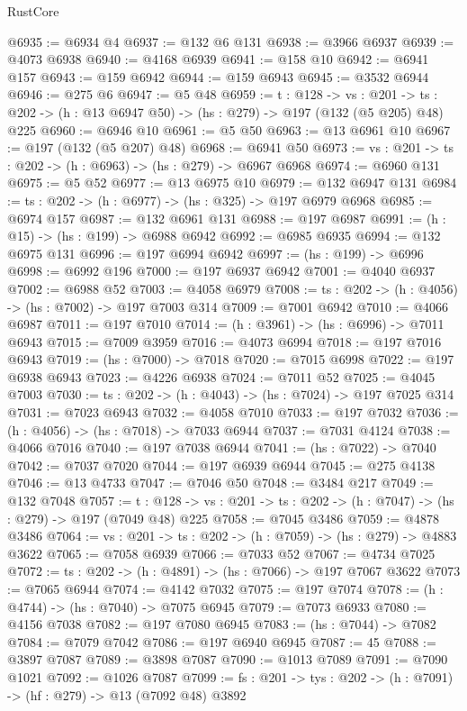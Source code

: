 \begin{lexlean}{RustCore}
\begin{coremodule}
@6935 := @6934 @4
@6937 := @132 @6 @131
@6938 := @3966 @6937
@6939 := @4073 @6938
@6940 := @4168 @6939
@6941 := @158 @10
@6942 := @6941 @157
@6943 := @159 @6942
@6944 := @159 @6943
@6945 := @3532 @6944
@6946 := @275 @6
@6947 := @5 @48
@6959 := {t : @128} ->
  {vs : @201} -> {ts : @202} -> (h : @13 @6947 @50) -> (hs : @279) -> @197 (@132 (@5 @205) @48) @225
@6960 := @6946 @10
@6961 := @5 @50
@6963 := @13 @6961 @10
@6967 := @197 (@132 (@5 @207) @48)
@6968 := @6941 @50
@6973 := {vs : @201} -> {ts : @202} -> (h : @6963) -> (hs : @279) -> @6967 @6968
@6974 := @6960 @131
@6975 := @5 @52
@6977 := @13 @6975 @10
@6979 := @132 @6947 @131
@6984 := {ts : @202} -> (h : @6977) -> (hs : @325) -> @197 @6979 @6968
@6985 := @6974 @157
@6987 := @132 @6961 @131
@6988 := @197 @6987
@6991 := (h : @15) -> (hs : @199) -> @6988 @6942
@6992 := @6985 @6935
@6994 := @132 @6975 @131
@6996 := @197 @6994 @6942
@6997 := (hs : @199) -> @6996
@6998 := @6992 @196
@7000 := @197 @6937 @6942
@7001 := @4040 @6937
@7002 := @6988 @52
@7003 := @4058 @6979
@7008 := {ts : @202} -> (h : @4056) -> (hs : @7002) -> @197 @7003 @314
@7009 := @7001 @6942
@7010 := @4066 @6987
@7011 := @197 @7010
@7014 := (h : @3961) -> (hs : @6996) -> @7011 @6943
@7015 := @7009 @3959
@7016 := @4073 @6994
@7018 := @197 @7016 @6943
@7019 := (hs : @7000) -> @7018
@7020 := @7015 @6998
@7022 := @197 @6938 @6943
@7023 := @4226 @6938
@7024 := @7011 @52
@7025 := @4045 @7003
@7030 := {ts : @202} -> (h : @4043) -> (hs : @7024) -> @197 @7025 @314
@7031 := @7023 @6943
@7032 := @4058 @7010
@7033 := @197 @7032
@7036 := (h : @4056) -> (hs : @7018) -> @7033 @6944
@7037 := @7031 @4124
@7038 := @4066 @7016
@7040 := @197 @7038 @6944
@7041 := (hs : @7022) -> @7040
@7042 := @7037 @7020
@7044 := @197 @6939 @6944
@7045 := @275 @4138
@7046 := @13 @4733
@7047 := @7046 @50
@7048 := @3484 @217
@7049 := @132 @7048
@7057 := {t : @128} ->
  {vs : @201} -> {ts : @202} -> (h : @7047) -> (hs : @279) -> @197 (@7049 @48) @225
@7058 := @7045 @3486
@7059 := @4878 @3486
@7064 := {vs : @201} -> {ts : @202} -> (h : @7059) -> (hs : @279) -> @4883 @3622
@7065 := @7058 @6939
@7066 := @7033 @52
@7067 := @4734 @7025
@7072 := {ts : @202} -> (h : @4891) -> (hs : @7066) -> @197 @7067 @3622
@7073 := @7065 @6944
@7074 := @4142 @7032
@7075 := @197 @7074
@7078 := (h : @4744) -> (hs : @7040) -> @7075 @6945
@7079 := @7073 @6933
@7080 := @4156 @7038
@7082 := @197 @7080 @6945
@7083 := (hs : @7044) -> @7082
@7084 := @7079 @7042
@7086 := @197 @6940 @6945
@7087 := 45
@7088 := @3897 @7087
@7089 := @3898 @7087
@7090 := @1013 @7089
@7091 := @7090 @1021
@7092 := @1026 @7087
@7099 := {fs : @201} -> {tys : @202} -> (h : @7091) -> (hf : @279) -> @13 (@7092 @48) @3892

\end{coremodule}
\end{lexlean}
